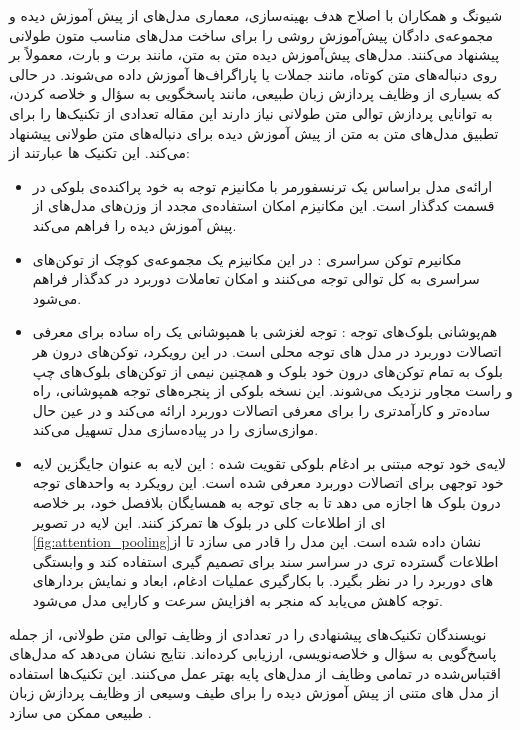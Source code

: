 شیونگ و همکاران  با اصلاح هدف بهینه‌سازی، معماری مدل‌‌های از پیش آموزش دیده و مجموعه‌ی دادگان پیش‌آموزش
روشی را برای ساخت مدل‌های مناسب متون طولانی پیشنهاد می‌کنند.  مدل‌های پيش‌آموزش دیده متن به متن، مانند برت و بارت، معمولاً بر روی دنباله‌های متن کوتاه، مانند جملات یا پاراگراف‌ها آموزش داده می‌شوند. در حالی که بسیاری از وظایف پردازش زبان طبیعی، مانند پاسخگویی به سؤال و خلاصه کردن، به توانایی پردازش توالی متن طولانی نیاز دارند این مقاله تعدادی از تکنیک‌ها را برای تطبیق مدل‌های متن به متن از پیش آموزش دیده برای دنباله‌های متن طولانی پیشنهاد می‌کند. این تکنیک ها عبارتند از:
\begin{itemize}
	\item{
ارائه‌ی مدل  براساس یک ترنسفورمر با 	مکانیزم توجه به خود پراکنده‌ی بلوکی
در قسمت کدگذار است. این مکانیزم امکان استفاده‌ی مجدد از وزن‌های مدل‌های از پیش آموزش دیده را فراهم می‌کند.	
}
	
	\item {
	مکانیرم توکن سراسری
:
در این مکانیزم یک مجموعه‌ی کوچک از توکن‌های سراسری به کل توالی توجه می‌کنند و امکان تعاملات دوربرد در کدگذار فراهم می‌شود.
}
\item{
هم‌پوشانی بلوک‌های توجه
: توجه لغزشی با همپوشانی یک راه ساده برای معرفی اتصالات دوربرد در مدل های توجه محلی است. در این رویکرد، توکن‌های درون هر بلوک به تمام توکن‌های درون خود بلوک و همچنین نیمی از توکن‌های بلوک‌های چپ و راست مجاور نزدیک می‌شوند. این نسخه بلوکی از پنجره‌های توجه همپوشانی، راه ساده‌تر و کارآمدتری را برای معرفی اتصالات دوربرد ارائه می‌کند و در عین حال موازی‌سازی را در پیاده‌سازی مدل تسهیل می‌کند.

}
\item{
 لایه‌ی خود توجه مبتنی بر ادغام  بلوکی تقویت شده
:
این  لایه به عنوان جایگزین لایه خود توجهی برای اتصالات دوربرد معرفی شده است. این رویکرد به واحدهای توجه درون بلوک ها اجازه می دهد تا به جای توجه به همسایگان بلافصل خود، بر خلاصه ای از اطلاعات کلی در بلوک ها تمرکز کنند. این لایه در تصویر  \ref{fig:attention_pooling}نشان داده شده است. این مدل را قادر می سازد تا از اطلاعات گسترده تری در سراسر سند برای تصمیم گیری استفاده کند و وابستگی های دوربرد را در نظر بگیرد. با بکارگیری عملیات ادغام، ابعاد و نمایش بردارهای توجه کاهش می‌یابد که منجر به افزایش سرعت و کارایی مدل می‌شود.}
\end{itemize}
نویسندگان  تکنیک‌های پیشنهادی را در تعدادی از وظایف توالی متن طولانی، از جمله پاسخ‌گویی به سؤال و خلاصه‌نویسی، ارزیابی کرده‌اند. نتایج نشان می‌دهد که مدل‌های اقتباس‌شده در تمامی وظایف از مدل‌های پایه بهتر عمل می‌کنند.
این تکنیک‌ها استفاده از مدل های متنی از پیش آموزش دیده را برای طیف وسیعی از وظایف پردازش زبان طبیعی ممکن می سازد
\cite{Xiong2022AdaptingPT}.


